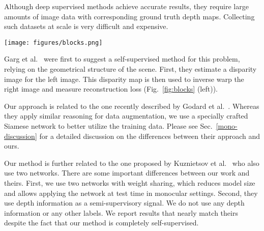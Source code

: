 \documentclass[10pt,twocolumn,letterpaper]{article}
\newcommand{\minisection}[1]{\vspace{1mm}\noindent{\textbf{#1}}}
\begin{document}
Although deep supervised methods achieve accurate results, they require large amounts of image data with corresponding ground truth depth maps. Collecting such datasets at scale is very difficult and expensive.

\begin{figure*}[t]
	\centering
	\texttt{[image: figures/blocks.png]}
	\caption{{\bf Comparison of system architectures.} Left: The method of Garg et al.~\cite{garg2016unsupervised} uses the right image only as a supervisory signal. Center: The method of Godard et al.~\cite{monodepth17} favors the left image over the right image. Both methods use a single image as input during training. Right: Our Siamese network trains on pairs of images, treating them both equally, by flipping the right image. Hence, our loss combines errors from two separate predictions, equally treating both views and their predictions. At test time, only the area bounded by the dashed line is used; the rest of the blocks are used only for training.}
	\label{fig:blocks}
\end{figure*}


\minisection{Self-supervised, deep, monocular methods.} Garg et al.~\cite{garg2016unsupervised} were first to suggest a self-supervised method for this problem, relying on the geometrical structure of the scene. First, they estimate a disparity image for the left image. This disparity map is then used to inverse warp the right image and measure reconstruction loss (Fig.~\ref{fig:blocks} (left)).

Our approach is related to the one recently described by Godard et al.~\cite{monodepth17}. Whereas they apply similar reasoning for data augmentation, we use a specially crafted Siamese network to better utilize the training data. Please see Sec.~\ref{mono-discussion} for a detailed discussion on the differences between their approach and ours.

Our method is further related to the one proposed by Kuznietsov et al.~\cite{kuznietsov2017semi} who also use two networks. There are some important differences between our work and theirs. First, we use two networks with weight sharing, which reduces model size and allows applying the network at test time in monocular settings. Second, they use depth information as a semi-supervisory signal. We do not use any depth information or any other labels. We report results that nearly match theirs despite the fact that our method is completely self-supervised.
\end{document}
